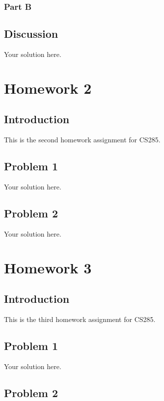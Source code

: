 \documentclass[12pt,oneside]{book}
\begin{document}
\subsection{Part B}

\section{Discussion}

Your solution here.

\chapter{Homework 2}

\section{Introduction}

This is the second homework assignment for CS285.

\section{Problem 1}

Your solution here.

\section{Problem 2}

Your solution here.

\chapter{Homework 3}

\section{Introduction}

This is the third homework assignment for CS285.

\section{Problem 1}

Your solution here.

\section{Problem 2}
\end{document}
